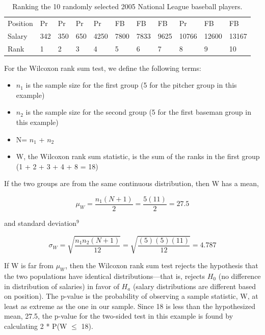 \documentclass[
]{report}
\providecommand{\tightlist}{%
  \setlength{\itemsep}{0pt}\setlength{\parskip}{0pt}}
\begin{document}
\begin{table}

\caption{\label{tab:table3}Ranking the 10 randomly selected 2005 National League baseball players.}
\centering
\begin{tabular}[t]{lllllllllll}
\toprule
Position & Pr & Pr & Pr & Pr & FB & FB & FB & Pr & FB & FB\\
Salary & 342 & 350 & 650 & 4250 & 7800 & 7833 & 9625 & 10766 & 12600 & 13167\\
Rank & 1 & 2 & 3 & 4 & 5 & 6 & 7 & 8 & 9 & 10\\
\bottomrule
\end{tabular}
\end{table}

For the Wilcoxon rank sum test, we define the following terms:

\begin{itemize}
\tightlist
\item
  \(n_1\) is the sample size for the first group (5 for the pitcher group in this example)
\item
  \(n_2\) is the sample size for the second group (5 for the first baseman group in this example)
\item
  N= \(n_1\) + \(n_2\)
\item
  W, the Wilcoxon rank sum statistic, is the sum of the ranks in the first group
  (1 + 2 + 3 + 4 + 8 = 18)
\end{itemize}

If the two groups are from the same continuous distribution, then W has a mean,

\begin{equation} 
  \mu_W = \frac{n_1(N+1)}{2} = \frac{5(11)}{2}=27.5
  \tag{1.3} \label{eq:1_3}
\end{equation}

and standard deviation\(^9\)

\begin{equation} 
  \sigma_W = \sqrt{\frac{n_1n_2(N+1)}{12}} = \sqrt{\frac{(5)(5)(11)}{12}}= 4.787
  \tag{1.4} \label{eq:1_4}
\end{equation}

If W is far from \(\mu_W\), then the Wilcoxon rank sum test rejects the hypothesis that the two populations have identical distributions---that is, rejects \(H_0\) (no difference in distribution of salaries) in favor of \(H_a\) (salary distributions are different based on position). The p-value is the probability of observing a sample statistic, W, at least as extreme as the one in our sample. Since 18 is less than the hypothesized mean, 27.5, the p-value for the two-sided test in this example is found by calculating 2 * P(W \(\leq\) 18).
\end{document}
